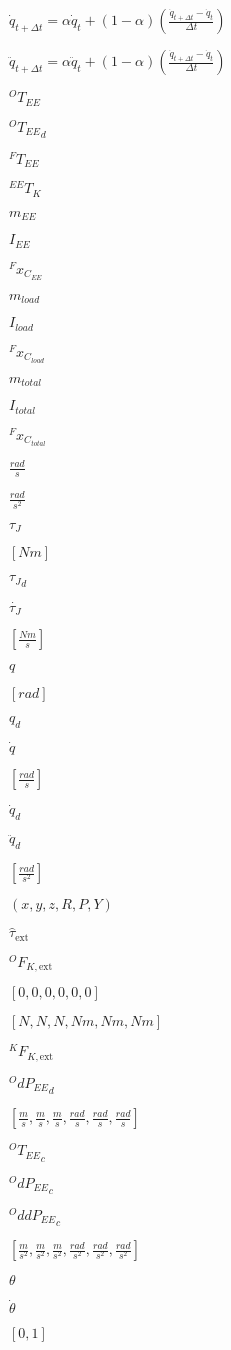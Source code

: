 \documentclass{article}
\begin{document}
$ \dot{q}_{t + \Delta t} = \alpha \dot{q}_{t}
+ ( 1 - \alpha)\left(\frac{\dot{q}_{t + \Delta t} - \dot{q}_{t}}{\Delta t}\right) $
\pagebreak

$ \ddot{q}_{t + \Delta t} = \alpha \ddot{q}_{t}
+ ( 1 - \alpha)\left(\frac{\dot{q}_{t + \Delta t} - \dot{q}_{t}}{\Delta t}\right) $
\pagebreak

$^{O}T_{EE}$
\pagebreak

${^OT_{EE}}_{d}$
\pagebreak

$^{F}T_{EE}$
\pagebreak

$^{EE}T_{K}$
\pagebreak

$m_{EE}$
\pagebreak

$I_{EE}$
\pagebreak

$^{F}x_{C_{EE}}$
\pagebreak

$m_{load}$
\pagebreak

$I_{load}$
\pagebreak

$^{F}x_{C_{load}}$
\pagebreak

$m_{total}$
\pagebreak

$I_{total}$
\pagebreak

$^{F}x_{C_{total}}$
\pagebreak

$\frac{rad}{s}$
\pagebreak

$\frac{rad}{s^2}$
\pagebreak

$\tau_{J}$
\pagebreak

$[Nm]$
\pagebreak

${\tau_J}_d$
\pagebreak

$\dot{\tau_{J}}$
\pagebreak

$[\frac{Nm}{s}]$
\pagebreak

$q$
\pagebreak

$[rad]$
\pagebreak

$q_d$
\pagebreak

$\dot{q}$
\pagebreak

$[\frac{rad}{s}]$
\pagebreak

$\dot{q}_d$
\pagebreak

$\ddot{q}_d$
\pagebreak

$[\frac{rad}{s^2}]$
\pagebreak

$(x,y,z,R,P,Y)$
\pagebreak

$\hat{\tau}_{\text{ext}}$
\pagebreak

$^OF_{K,\text{ext}}$
\pagebreak

$[0,0,0,0,0,0]$
\pagebreak

$[N,N,N,Nm,Nm,Nm]$
\pagebreak

$^{K}F_{K,\text{ext}}$
\pagebreak

${^OdP_{EE}}_{d}$
\pagebreak

$[\frac{m}{s},\frac{m}{s},\frac{m}{s},\frac{rad}{s},\frac{rad}{s},\frac{rad}{s}]$
\pagebreak

${^OT_{EE}}_{c}$
\pagebreak

${^OdP_{EE}}_{c}$
\pagebreak

${^OddP_{EE}}_{c}$
\pagebreak

$[\frac{m}{s^2},\frac{m}{s^2},\frac{m}{s^2},\frac{rad}{s^2},\frac{rad}{s^2},\frac{rad}{s^2}]$
\pagebreak

$\theta$
\pagebreak

$\dot{\theta}$
\pagebreak

$[0, 1]$
\pagebreak
\end{document}
